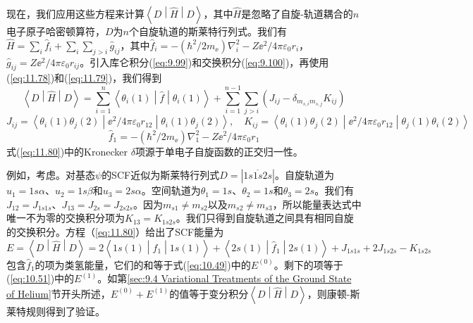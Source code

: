     现在，我们应用这些方程来计算$\left\langle D \middle| \hat{H} \middle| D \right\rangle$，其中$\hat{H}$是忽略了自旋-轨道耦合的$n$电子原子哈密顿算符，$D$为$n$个自旋轨道的斯莱特行列式。我们有$\hat{H} = \sum_i\hat{f}_i + \sum_i\sum_{j>i}\hat{g}_{ij}$，其中$\hat{f}_i = -\left(\hbar^2/2m_{\ee }\right)\nabla_i^2 - Z\ee ^2/4\pi\varepsilon_0r_i$，$\hat{g}_{ij} = Z\ee ^2/4\pi\varepsilon_0r_{ij}$。引入库仑积分(\ref{eq:9.99})和交换积分(\ref{eq:9.100})，再使用(\ref{eq:11.78})和(\ref{eq:11.79})，我们得到
    \begin{equation}
        \left\langle D \middle| \hat{H} \middle| D \right\rangle = \sum_{i=1}^{n}\left\langle \theta_i \left( 1 \right) \middle| \hat{f} \middle| \theta_i \left( 1 \right) \right\rangle + \sum_{i=1}^{n-1} \sum_{j>i}\left( J_{ij} - \delta_{m_{s,i}m_{s,j}}K_{ij} \right)
        \label{eq:11.80}
    \end{equation}
    \begin{equation}
        J_{ij} = \left\langle \theta_i \left(1\right) \theta_j \left(2\right) \middle| \ee ^2/4\pi\varepsilon_0r_{12} \middle| \theta_i \left(1\right) \theta_j \left(2\right) \right\rangle, \quad K_{ij} = \left\langle \theta_i \left(1\right) \theta_j \left(2\right) \middle| \ee ^2/4\pi\varepsilon_0r_{12} \middle| \theta_j \left(1\right) \theta_i \left(2\right) \right\rangle
        \label{eq:11.81}
    \end{equation}
    \begin{equation}
        \hat{f}_1 = -\left(\hbar^2/2m_{\ee }\right)\nabla_1^2 - Z\ee ^2/4\pi\varepsilon_0r_1
        \label{eq:11.82}
    \end{equation}
    式(\ref{eq:11.80})中的Kronecker $\delta$项源于单电子自旋函数的正交归一性。

    例如，考虑。对基态$\psi$的SCF近似为斯莱特行列式$D = \left|1s\overline{1s}2s\right|$。自旋轨道为$u_1 = 1s\alpha$、$u_2 = 1s\beta$和$u_3 = 2s\alpha$。空间轨道为$\theta_1 = 1s$、$\theta_2 = 1s$和$\theta_3 = 2s$。我们有$J_{12} = J_{1s1s}$、$J_{13} = J_{2s} = J_{2s2s}$。因为$m_{s1} \neq m_{s2}$以及$m_{s2} \neq m_{s3}$，所以能量表达式中唯一不为零的交换积分项为$K_{13} = K_{1s2s}$。我们只得到自旋轨道之间具有相同自旋的交换积分。方程（\ref{eq:11.80}）给出了SCF能量为
    \begin{equation*}
        E = \left\langle D \middle| \hat{H} \middle| D \right\rangle = 2 \left\langle 1s\left(1\right) \middle| \hat{f}_1 \middle| 1s\left(1\right) \right\rangle + \left\langle 2s\left(1\right) \middle| \hat{f}_1 \middle| 2s\left(1\right) \right\rangle + J_{1s1s} + 2J_{1s2s} - K_{1s2s}
    \end{equation*}
    包含$\hat{f}_1$的项为类氢能量，它们的和等于式(\ref{eq:10.49})中的$E^{\left(0\right)}$。剩下的项等于(\ref{eq:10.51})中的$E^{\left(1\right)}$。如第\ref{sec:9.4 Variational Treatments of the Ground State of Helium}节开头所述，$E^{\left(0\right)} + E^{\left(1\right)}$的值等于变分积分$\left\langle D \middle| \hat{H} \middle| D \right\rangle$，则康顿-斯莱特规则得到了验证。

